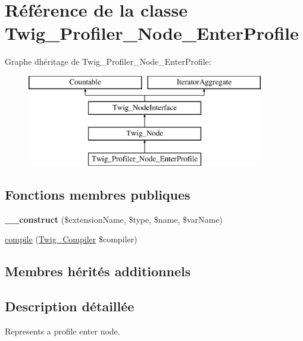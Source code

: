 \hypertarget{class_twig___profiler___node___enter_profile}{}\section{Référence de la classe Twig\+\_\+\+Profiler\+\_\+\+Node\+\_\+\+Enter\+Profile}
\label{class_twig___profiler___node___enter_profile}
Graphe d\textquotesingle{}héritage de Twig\+\_\+\+Profiler\+\_\+\+Node\+\_\+\+Enter\+Profile\+:\begin{figure}[H]
\begin{center}
\leavevmode
\includegraphics[height=4.000000cm]{class_twig___profiler___node___enter_profile}
\end{center}
\end{figure}
\subsection*{Fonctions membres publiques}
\begin{DoxyCompactItemize}
\item 
{\bfseries \+\_\+\+\_\+construct} (\$extension\+Name, \$type, \$name, \$var\+Name)\hypertarget{class_twig___profiler___node___enter_profile_ad414eb2ba504d225f3290a4c48a6a149}{}\label{class_twig___profiler___node___enter_profile_ad414eb2ba504d225f3290a4c48a6a149}

\item 
\hyperlink{class_twig___profiler___node___enter_profile_a4e0faa87c3fae583620b84d3607085da}{compile} (\hyperlink{class_twig___compiler}{Twig\+\_\+\+Compiler} \$compiler)
\end{DoxyCompactItemize}
\subsection*{Membres hérités additionnels}


\subsection{Description détaillée}
Represents a profile enter node.


